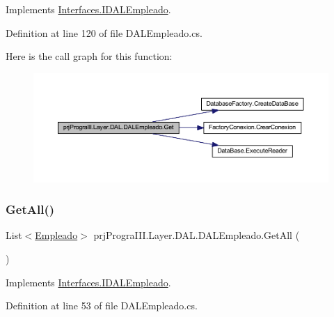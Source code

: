 Implements \hyperlink{interface_interfaces_1_1_i_d_a_l_empleado_a3a30db206c173af0ed7b44cf21e1de5c}{Interfaces.\+I\+D\+A\+L\+Empleado}.



Definition at line 120 of file D\+A\+L\+Empleado.\+cs.

Here is the call graph for this function\+:
\nopagebreak
\begin{figure}[H]
\begin{center}
\leavevmode
\includegraphics[width=350pt]{classprj_progra_i_i_i_1_1_layer_1_1_d_a_l_1_1_d_a_l_empleado_a0f1fb578c7f7284e5bdd88be66eb8641_cgraph}
\end{center}
\end{figure}
\hypertarget{classprj_progra_i_i_i_1_1_layer_1_1_d_a_l_1_1_d_a_l_empleado_ae4244254c51367a0332e10ffc7e68fcc}{}\label{classprj_progra_i_i_i_1_1_layer_1_1_d_a_l_1_1_d_a_l_empleado_ae4244254c51367a0332e10ffc7e68fcc} 
\subsubsection{\texorpdfstring{Get\+All()}{GetAll()}}
{\footnotesize\ttfamily List$<$\hyperlink{classprj_progra_i_i_i_1_1_layer_1_1_entities_1_1_empleado}{Empleado}$>$ prj\+Progra\+I\+I\+I.\+Layer.\+D\+A\+L.\+D\+A\+L\+Empleado.\+Get\+All (\begin{DoxyParamCaption}{ }\end{DoxyParamCaption})}



Implements \hyperlink{interface_interfaces_1_1_i_d_a_l_empleado_a4e47f55e63675f0430e99e0873d269ff}{Interfaces.\+I\+D\+A\+L\+Empleado}.



Definition at line 53 of file D\+A\+L\+Empleado.\+cs.

